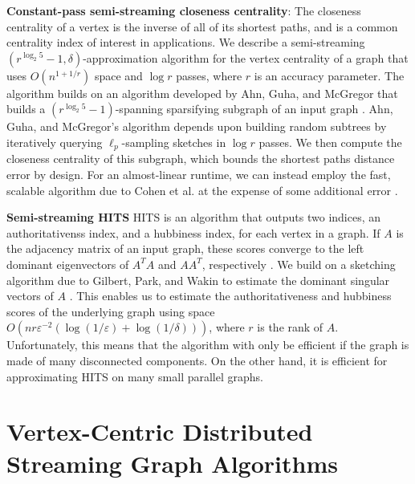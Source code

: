\documentclass{report}
\begin{document}
\noindent
\textbf{Constant-pass semi-streaming closeness centrality}:
The closeness centrality of a vertex is the inverse of all of its shortest paths, and is a common centrality index of interest in applications.
We describe a semi-streaming $(r^{\log_2 5} -1, \delta)$-approximation algorithm for the vertex centrality of a graph that uses $O(n^{1+1/r})$ space and $\log r$ passes, where $r$ is an accuracy parameter.
The algorithm builds on an algorithm developed by Ahn, Guha, and McGregor that builds a $(r^{\log_2 5} -1)$-spanning sparsifying subgraph of an input graph \cite{ahn2012graph}.
Ahn, Guha, and McGregor's algorithm depends upon building random subtrees by iteratively querying $\ell_p$-sampling sketches in $\log r$ passes.
We then compute the closeness centrality of this subgraph, which bounds the shortest paths distance error by design.
For an almost-linear runtime, we can instead employ the fast, scalable algorithm due to Cohen et al. at the expense of some additional error \cite{cohen2014computing}. 






\noindent
\textbf{Semi-streaming HITS}
HITS is an algorithm that outputs two indices, an authoritativenss index, and a hubbiness index, for each vertex in a graph.
If $A$ is the adjacency matrix of an input graph, these scores converge to the left dominant eigenvectors of $A^TA$ and $AA^T$, respectively \cite{kleinberg1999authoritative}. 
We build on a sketching algorithm due to Gilbert, Park, and Wakin to estimate the dominant singular vectors of $A$ \cite{gilbert2012sketched}. 
This enables us to estimate the authoritativeness and hubbiness scores of the underlying graph using space $O(nr\varepsilon^{-2}(\log (1/\varepsilon) + \log(1/\delta)))$, where $r$ is the rank of $A$.
Unfortunately, this means that the algorithm with only be efficient if the graph is made of many disconnected components.
On the other hand, it is efficient for approximating HITS on many small parallel graphs.




\section{Vertex-Centric Distributed Streaming Graph Algorithms} \label{intro:sec:distributed_streaming}
\end{document}
